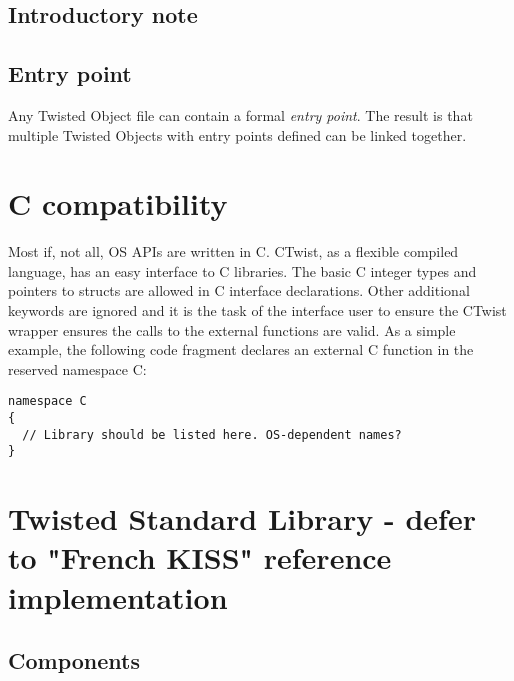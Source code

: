 \documentclass[a4paper,11pt]{article}
\begin{document}
  \subsection{Introductory note}


  \subsection{Entry point}

Any Twisted Object file can contain a formal \emph{entry point}.
The result is that multiple Twisted Objects with entry points defined can be linked together. 

\section{C compatibility} \label{sec:c_compatibility}

Most if, not all, OS APIs are written in C.
CTwist, as a flexible compiled language, has an easy interface to C libraries.
The basic C integer types and pointers to structs are allowed in C interface declarations.
Other additional keywords are ignored and it is the task of the interface user to ensure the CTwist wrapper ensures the calls to the external functions are valid.
As a simple example, the following code fragment declares an external C function in the reserved namespace C:
\begin{lstlisting}
namespace C
{
  // Library should be listed here. OS-dependent names?
}
\end{lstlisting}

\section{Twisted Standard Library -  defer to "French KISS" reference implementation}
  \subsection{Components}
\end{document}
